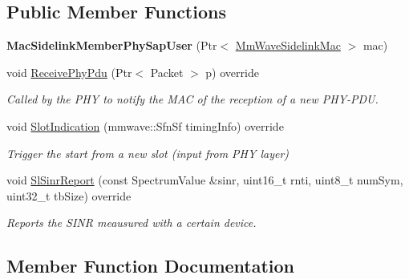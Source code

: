 \subsection*{Public Member Functions}
\begin{DoxyCompactItemize}
\item 
\mbox{\label{classns3_1_1millicar_1_1MacSidelinkMemberPhySapUser_a52793da75596df4b84a8504274a6deb8}} 
{\bfseries Mac\+Sidelink\+Member\+Phy\+Sap\+User} (Ptr$<$ \hyperlink{classns3_1_1millicar_1_1MmWaveSidelinkMac}{Mm\+Wave\+Sidelink\+Mac} $>$ mac)
\item 
void \hyperlink{classns3_1_1millicar_1_1MacSidelinkMemberPhySapUser_a430a252dfedeea5228eab8e62af82960}{Receive\+Phy\+Pdu} (Ptr$<$ Packet $>$ p) override
\begin{DoxyCompactList}\small\item\em Called by the P\+HY to notify the M\+AC of the reception of a new P\+H\+Y-\/\+P\+DU. \end{DoxyCompactList}\item 
void \hyperlink{classns3_1_1millicar_1_1MacSidelinkMemberPhySapUser_ae204b07ff1b6fcd8d50dc71d21b51278}{Slot\+Indication} (mmwave\+::\+Sfn\+Sf timing\+Info) override
\begin{DoxyCompactList}\small\item\em Trigger the start from a new slot (input from P\+HY layer) \end{DoxyCompactList}\item 
void \hyperlink{classns3_1_1millicar_1_1MacSidelinkMemberPhySapUser_a68dd0cadd60b7bf0d2a3ac34a15a8e4c}{Sl\+Sinr\+Report} (const Spectrum\+Value \&sinr, uint16\+\_\+t rnti, uint8\+\_\+t num\+Sym, uint32\+\_\+t tb\+Size) override
\begin{DoxyCompactList}\small\item\em Reports the S\+I\+NR meausured with a certain device. \end{DoxyCompactList}\end{DoxyCompactItemize}


\subsection{Member Function Documentation}
\mbox{\label{classns3_1_1millicar_1_1MacSidelinkMemberPhySapUser_a430a252dfedeea5228eab8e62af82960}} 
